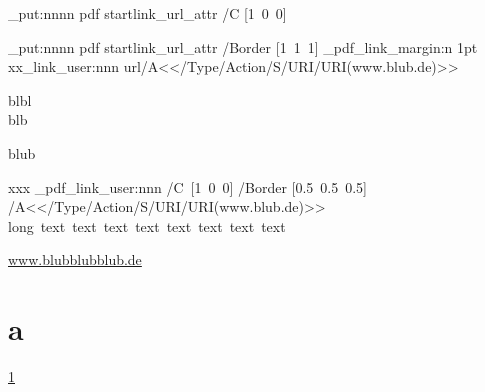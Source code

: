 \documentclass{article}
\begin{document}
\ExplSyntaxOn
\hook_put:nnnn
     { pdf }
     { startlink_url_attr }
     { /C }
     { [1~0~0] }

\hook_put:nnnn
       { pdf }
       { startlink_url_attr }
       { /Border }
       { [1~1~1] }
\driver_pdf_link_margin:n {1pt}
xx\pdf_link_user:nnn {url}{/A<</Type/Action/S/URI/URI(www.blub.de)>>}{blbl\\blb\par blub}

\par\bigskip
xxx
\driver_pdf_link_user:nnn
 {/C~[1~0~0]
 /Border [0.5~0.5~0.5]}
 {/A<</Type/Action/S/URI/URI(www.blub.de)>>}
 {long~text~text~text~text~text~text~text~text}
 
\url{www.blubblubblub.de}
\section{a}\label{a}
\ref{a}
\ExplSyntaxOff

\end{document}
